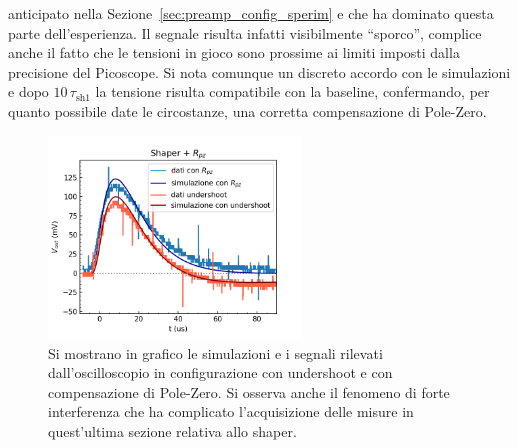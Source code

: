 anticipato nella Sezione~\ref{sec:preamp_config_sperim} e che ha dominato questa parte dell'esperienza.
Il segnale risulta infatti visibilmente ``sporco'', complice anche il fatto
che le tensioni in gioco sono prossime ai limiti imposti dalla precisione
del Picoscope. Si nota comunque un discreto accordo con le simulazioni e
dopo $10\, \tau_{\text{sh1}}$ la tensione risulta compatibile con la baseline, confermando, per quanto possibile date le circostanze, una
corretta compensazione di Pole-Zero.
\begin{figure}[h]
\centering
\includegraphics[width=0.6\textwidth]{../shaper/images/undershoot}
\caption{\footnotesize{Si mostrano in grafico le simulazioni e i segnali rilevati dall'oscilloscopio in configurazione con undershoot e con compensazione di Pole-Zero. Si osserva anche il fenomeno di forte interferenza che ha complicato l'acquisizione delle misure in quest'ultima sezione relativa allo shaper.}}\label{fig:shaper_undershoot}
\end{figure}
